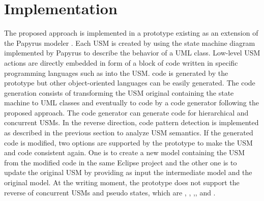 \section{Implementation}
\label{sec:implementation}

The proposed approach is implemented in a prototype existing as an extension of the Papyrus modeler \cite{cea-list_papyrus_????}. Each USM is created by using the state machine diagram implemented by Papyrus to describe the behavior of a UML class. Low-level USM actions are directly embedded in form of a block of code written in specific programming languages such as  into the USM.  code is generated by the prototype but other object-oriented languages can be easily generated. %
The code generation consists of transforming the USM original containing the state machine to UML classes and eventually to code by a code generator following the proposed approach. The code generator can generate code for hierarchical and concurrent USMs. In the reverse direction, code pattern detection is implemented as described in the previous section to analyze USM semantics. If the generated code is modified, two options are supported by the prototype to make the USM and code consistent again. One is to create a new model containing the USM from the modified code in the same Eclipse project and the other one is to update the original USM by providing as input the intermediate model and the original model. At the writing moment, the prototype does not support the reverse of concurrent USMs and pseudo states, which are , , ,, and .